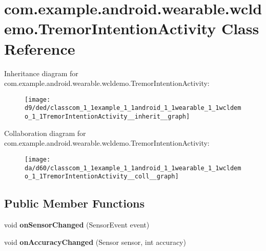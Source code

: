 \hypertarget{classcom_1_1example_1_1android_1_1wearable_1_1wcldemo_1_1TremorIntentionActivity}{}\section{com.\+example.\+android.\+wearable.\+wcldemo.\+Tremor\+Intention\+Activity Class Reference}
\label{classcom_1_1example_1_1android_1_1wearable_1_1wcldemo_1_1TremorIntentionActivity}


Inheritance diagram for com.\+example.\+android.\+wearable.\+wcldemo.\+Tremor\+Intention\+Activity\+:\nopagebreak
\begin{figure}[H]
\begin{center}
\leavevmode
\texttt{[image: d9/ded/classcom\_1\_1example\_1\_1android\_1\_1wearable\_1\_1wcldemo\_1\_1TremorIntentionActivity\_\_inherit\_\_graph]}
\end{center}
\end{figure}


Collaboration diagram for com.\+example.\+android.\+wearable.\+wcldemo.\+Tremor\+Intention\+Activity\+:\nopagebreak
\begin{figure}[H]
\begin{center}
\leavevmode
\texttt{[image: da/d60/classcom\_1\_1example\_1\_1android\_1\_1wearable\_1\_1wcldemo\_1\_1TremorIntentionActivity\_\_coll\_\_graph]}
\end{center}
\end{figure}
\subsection*{Public Member Functions}
\begin{DoxyCompactItemize}
\item 
void {\bfseries on\+Sensor\+Changed} (Sensor\+Event event)\hypertarget{classcom_1_1example_1_1android_1_1wearable_1_1wcldemo_1_1TremorIntentionActivity_adf5789c69e2de89b36894200176cd633}{}\label{classcom_1_1example_1_1android_1_1wearable_1_1wcldemo_1_1TremorIntentionActivity_adf5789c69e2de89b36894200176cd633}

\item 
void {\bfseries on\+Accuracy\+Changed} (Sensor sensor, int accuracy)\hypertarget{classcom_1_1example_1_1android_1_1wearable_1_1wcldemo_1_1TremorIntentionActivity_a63dfe2ade4d0d5c05bb569b86bf53628}{}\label{classcom_1_1example_1_1android_1_1wearable_1_1wcldemo_1_1TremorIntentionActivity_a63dfe2ade4d0d5c05bb569b86bf53628}

\end{DoxyCompactItemize}
